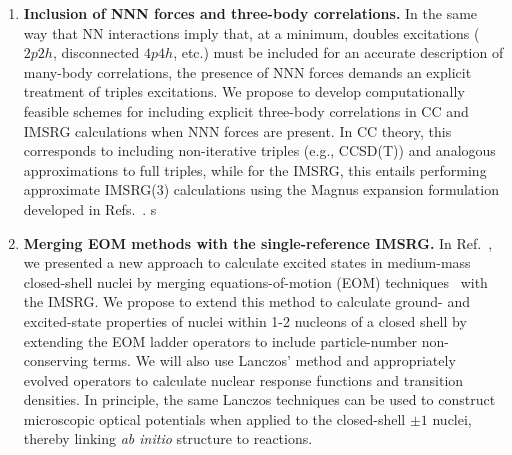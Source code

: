 \begin{enumerate}
 
 \item {\bf Inclusion of NNN forces and three-body correlations.} 
 In the same way that NN interactions imply that, at a minimum, doubles excitations ($2p2h$,
  disconnected $4p4h$, etc.) must be included for an accurate
  description of many-body correlations, the presence of NNN forces
  demands an explicit treatment of triples excitations. We propose to 
  develop computationally feasible schemes for including explicit
  three-body correlations in CC and IMSRG calculations when NNN forces are present.  In CC theory, this corresponds to including
  non-iterative triples (e.g., CCSD(T)) and analogous approximations to full triples, while for the IMSRG, this entails performing approximate IMSRG(3)
  calculations using the Magnus expansion formulation developed in Refs.~\cite{TitusThesis, Morris:2015ve}. 
s
\item{\bf Merging EOM methods with the single-reference IMSRG.}
In Ref.~\cite{Parzuchowski:2016njm}, we presented a new approach to 
 calculate excited states in medium-mass closed-shell nuclei by merging 
 equations-of-motion (EOM) techniques~\cite{Rowe:1968eq} with the IMSRG.  We propose to extend this method to calculate ground- and excited-state properties of nuclei within 1-2 nucleons of a closed shell by extending the EOM ladder operators to include particle-number non-conserving terms. We will also use Lanczos' method and appropriately evolved operators to calculate nuclear response functions and transition densities. In principle, the same Lanczos techniques can be used to construct microscopic optical potentials when applied to the closed-shell $\pm 1$ nuclei, thereby linking \emph{ab initio} structure to reactions.
 

\end{enumerate}
